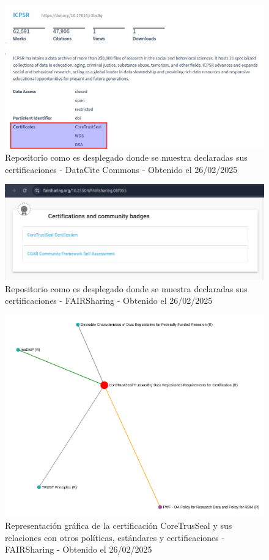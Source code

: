 \documentclass[runningheads]{llncs}
\begin{document}
\begin{figure}
    \centering
    \includegraphics[width=0.5\linewidth]{img/datacite_certified_repo.png}
    \caption{Repositorio como es desplegado donde se muestra declaradas sus certificaciones - DataCite Commons - Obtenido el 26/02/2025}
    \label{fig:datacite_certified_repo}
\end{figure}

\begin{figure}
    \centering
    \includegraphics[width=0.5\linewidth]{img/fairsharing_certified_repo.png}
    \caption{Repositorio como es desplegado donde se muestra declaradas sus certificaciones - FAIRSharing - Obtenido el 26/02/2025}
    \label{fig:fairsharing_certified_repo}
\end{figure}

\begin{figure}
    \centering
    \includegraphics[width=0.5\linewidth]{img/certificates_relations.png}
    \caption{Representación gráfica de la certificación CoreTrusSeal y sus relaciones con otros políticas, estándares y certificaciones - FAIRSharing - Obtenido el 26/02/2025}
    \label{fig:certificates_relations}
\end{figure}

\end{document}

